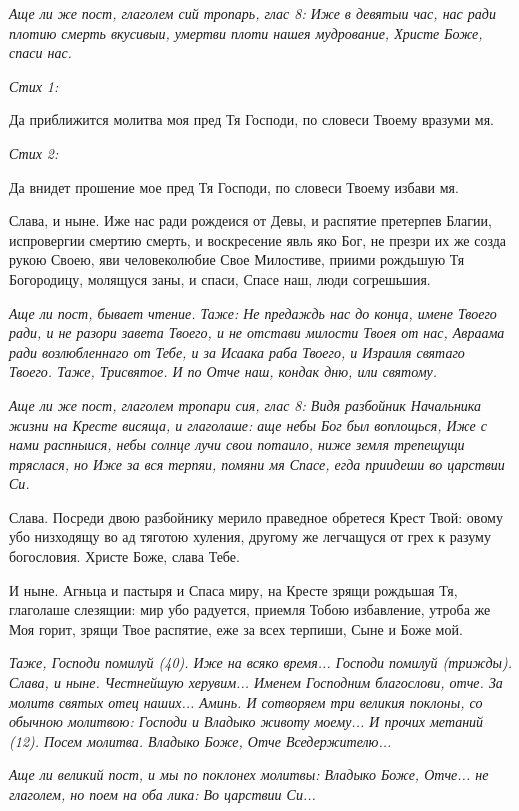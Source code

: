 \itshape Аще ли же пост, глаголем сий тропарь, глас 8:\normalfont{} Иже в девятыи час, нас ради плотию смерть вкусивыи, умертви плоти нашея мудрование, Христе Боже, спаси нас.


\itshape Стих 1:\normalfont{}


Да приближится молитва моя пред Тя Господи, по словеси Твоему вразуми мя.


\itshape Стих 2:\normalfont{}


Да внидет прошение мое пред Тя Господи, по словеси Твоему избави мя.


Слава, и ныне. Иже нас ради рождеися от Девы, и распятие претерпев Благии, испровергии смертию смерть, и воскресение явль яко Бог, не презри их же созда рукою Своею, яви человеколюбие Свое Милостиве, приими рождьшую Тя Богородицу, молящуся заны, и спаси, Спасе наш, люди согрешьшия.


\itshape Аще ли пост, бывает чтение. Таже:\normalfont{} Не предаждь нас до конца, имене Твоего ради, и не разори завета Твоего, и не отстави милости Твоея от нас, Авраама ради возлюбленнаго от Тебе, и за Исаака раба Твоего, и Израиля святаго Твоего. Таже, Трисвятое. И по Отче наш, кондак дню, или святому.


\itshape Аще ли же пост, глаголем тропари сия, глас 8:\normalfont{} Видя разбойник Начальника жизни на Кресте висяща, и глаголаше: аще небы Бог был воплощься, Иже с нами распныися, небы солнце лучи свои потаило, ниже земля трепещущи тряслася, но Иже за вся терпяи, помяни мя Спасе, егда приидеши во царствии Си.


Слава. Посреди двою разбойнику мерило праведное обретеся Крест Твой: овому убо низходящу во ад тяготою хуления, другому же легчащуся от грех к разуму богословия. Христе Боже, слава Тебе.


И ныне. Агньца и пастыря и Спаса миру, на Кресте зрящи рождьшая Тя, глаголаше слезящии: мир убо радуется, приемля Тобою избавление, утроба же Моя горит, зрящи Твое распятие, еже за всех терпиши, Сыне и Боже мой.


\itshape Таже,\normalfont{} Господи помилуй (40). Иже на всяко время... Господи помилуй \itshape (трижды)\normalfont{}. Слава, и ныне. Честнейшую херувим... Именем Господним благослови, отче. За молитв святых отец наших... Аминь. И сотворяем три великия поклоны, со обычною молитвою: Господи и Владыко животу моему... И прочих метаний (12). Посем молитва. Владыко Боже, Отче Вседержителю...


\itshape Аще ли великий пост, и мы по поклонех молитвы:\normalfont{} Владыко Боже, Отче... не глаголем, но поем на оба лика: Во царствии Си...


